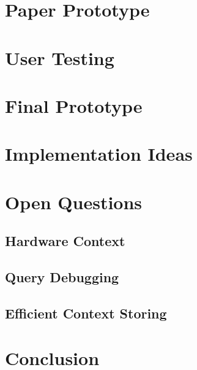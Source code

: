 \documentclass[runningheads]{llncs}
\begin{document}
\section{Paper Prototype}

\section{User Testing}

\section{Final Prototype}

\section{Implementation Ideas}

\section{Open Questions}
\subsection{Hardware Context}
\subsection{Query Debugging}
\subsection{Efficient Context Storing}

\section{Conclusion}

%

\end{document}
